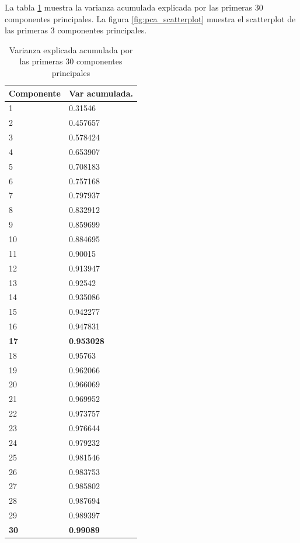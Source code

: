 \documentclass[journal]{IEEEtran}
\begin{document}
La tabla \ref{table:pca_results} muestra la varianza acumulada explicada 
por las primeras 30 componentes principales. La figura \ref{fig:pca_scatterplot}
muestra el scatterplot de las primeras 3 componentes principales.

\begin{table}[ht!]
\label{table:pca_results}
\caption{Varianza explicada acumulada por las primeras 30 componentes principales}
\centering
\begin{tabular}{l | l }
Componente & Var acumulada.  \\
\hline
 1  &  0.31546  \\
 2  &  0.457657  \\
 3  &  0.578424  \\
 4  &  0.653907  \\
 5  &  0.708183  \\
 6  &  0.757168  \\
 7  &  0.797937  \\
 8  &  0.832912  \\
 9  &  0.859699  \\
10  &  0.884695  \\
11  &  0.90015  \\
12  &  0.913947  \\
13  &  0.92542  \\
14  &  0.935086  \\
15  &  0.942277  \\
16  &  0.947831  \\
\textbf{17}  &  \textbf{0.953028}  \\
18  &  0.95763  \\
19  &  0.962066  \\
20  &  0.966069  \\
21  &  0.969952  \\
22  &  0.973757  \\
23  &  0.976644  \\
24  &  0.979232  \\
25  &  0.981546  \\
26  &  0.983753  \\
27  &  0.985802  \\
28  &  0.987694  \\
29  &  0.989397  \\
\textbf{30}  &  \textbf{0.99089}  \\
\end{tabular}
\end{table}
\end{document}
